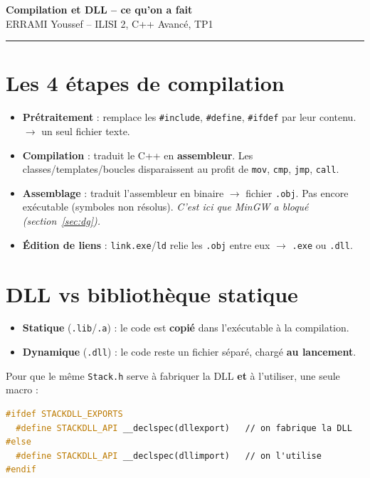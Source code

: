 \documentclass[11pt,a4paper]{article}
\newcommand{\pt}[1]{\textbf{\color{bleu}#1}}
\begin{document}
{\Large\bfseries\color{bleu} Compilation et DLL -- ce qu'on a fait}\\[2pt]
\small ERRAMI Youssef -- ILISI 2, C++ Avancé, TP1

\vspace{4pt}\hrule\vspace{10pt}

\section{Les 4 étapes de compilation}

\begin{itemize}
\item \pt{Prétraitement} : remplace les \texttt{\#include}, \texttt{\#define}, \texttt{\#ifdef} par leur contenu. $\to$ un seul fichier texte.
\item \pt{Compilation} : traduit le C++ en \pt{assembleur}. Les classes/templates/boucles disparaissent au profit de \texttt{mov}, \texttt{cmp}, \texttt{jmp}, \texttt{call}.
\item \pt{Assemblage} : traduit l'assembleur en binaire $\to$ fichier \texttt{.obj}. Pas encore exécutable (symboles non résolus). \textit{C'est ici que MinGW a bloqué (section~\ref{sec:dg}).}
\item \pt{Édition de liens} : \texttt{link.exe}/\texttt{ld} relie les \texttt{.obj} entre eux $\to$ \texttt{.exe} ou \texttt{.dll}.
\end{itemize}

\section{DLL vs bibliothèque statique}

\begin{itemize}
\item \pt{Statique} (\texttt{.lib}/\texttt{.a}) : le code est \textbf{copié} dans l'exécutable à la compilation.
\item \pt{Dynamique} (\texttt{.dll}) : le code reste un fichier séparé, chargé \textbf{au lancement}.
\end{itemize}

Pour que le même \texttt{Stack.h} serve à fabriquer la DLL \textbf{et} à l'utiliser, une seule macro :

\begin{lstlisting}[language=C++]
#ifdef STACKDLL_EXPORTS
  #define STACKDLL_API __declspec(dllexport)   // on fabrique la DLL
#else
  #define STACKDLL_API __declspec(dllimport)   // on l'utilise
#endif
\end{lstlisting}
\end{document}
